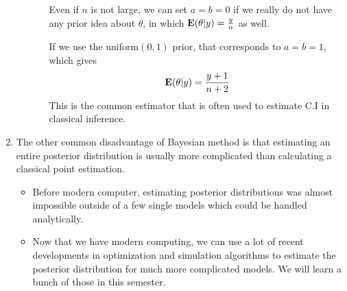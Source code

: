 \begin{enumerate}
\begin{itemize}
\begin{itemize}
            Even if $n$ is not large, we can set $a = b = 0$ if we really do not have any prior idea about $\theta$, in which ${\mathbf E}(\theta| y) = \frac{y}{n}$ as well.
            
            If we use the $\text{uniform}(0, 1)$ prior, that corresponds to $a=b=1$, which gives
            \[
                {\mathbf E}(\theta| y) = \frac{y+1}{n+2}
            \]
            This is the common estimator that is often used to estimate C.I in classical inference.
        \end{itemize}
    \end{itemize}
    \item The other common disadvantage of Bayesian method is that estimating an entire posterior distribution is usually more complicated than calculating a classical point estimation.

    \begin{itemize}
        \item Before modern computer, estimating posterior distributions was almost \\impossible outside of a few single models which could be handled analytically.
        \item Now that we have modern computing, we can use a lot of recent developments in optimization and simulation algorithms to estimate the posterior distribution for much more complicated models. We will learn a bunch of those in this semester.
    \end{itemize}

\end{enumerate}

